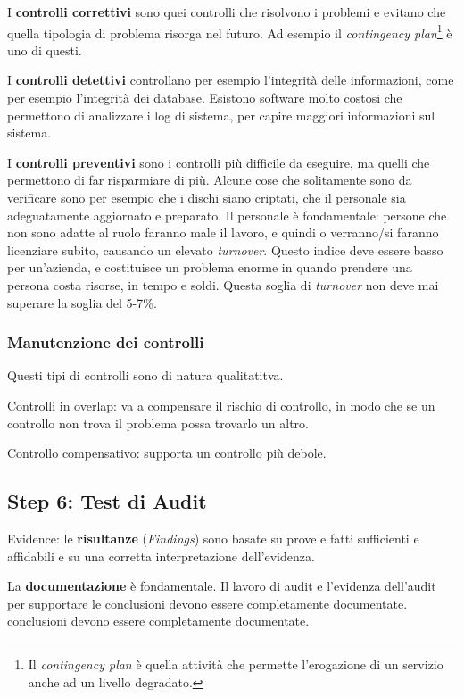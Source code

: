 I \textbf{controlli correttivi} sono quei controlli che risolvono i problemi e 
evitano che quella tipologia di problema risorga nel futuro. Ad esempio il 
\textit{contingency plan}\footnote{Il \textit{contingency plan} è quella 
attività che permette l'erogazione di un servizio anche ad un livello 
degradato.} è uno di questi.

I \textbf{controlli detettivi} controllano per esempio l'integrità delle 
informazioni, come per esempio l'integrità dei database. Esistono software molto 
costosi che permettono di analizzare i log di sistema, per capire maggiori 
informazioni sul sistema.

I \textbf{controlli preventivi} sono i controlli più difficile da eseguire, ma 
quelli che permettono di far risparmiare di più. Alcune cose che solitamente 
sono da verificare sono per esempio che i dischi siano criptati, che il 
personale sia adeguatamente aggiornato e preparato.
Il personale è fondamentale: persone che non sono adatte al ruolo faranno male 
il lavoro, e quindi o verranno/si faranno licenziare subito, causando un elevato 
\textit{turnover}. Questo indice deve essere basso per un'azienda, e costituisce 
un problema enorme in quando prendere una persona costa risorse, in tempo e 
soldi. Questa soglia di \textit{turnover} non deve mai superare la soglia del 
5-7\%.

\subsubsection{Manutenzione dei controlli}
Questi tipi di controlli sono di natura qualitatitva.

Controlli in overlap: va a compensare il rischio di controllo, in modo che se un 
controllo non trova il problema possa trovarlo un altro.

Controllo compensativo: supporta un controllo più debole.



\subsection{Step 6: Test di Audit}


Evidence: le \textbf{risultanze} (\emph{Findings}) sono basate su prove e fatti 
sufficienti e affidabili e su una corretta interpretazione dell'evidenza. 

La \textbf{documentazione} è fondamentale. Il lavoro di audit e l'evidenza 
dell'audit per supportare le conclusioni devono essere completamente 
documentate.
conclusioni devono essere completamente documentate. 

